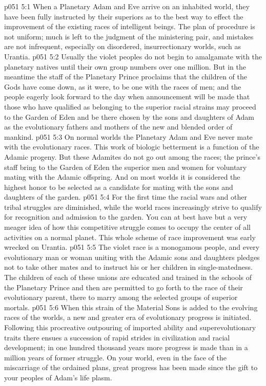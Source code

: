 \vs p051 5:1 When a Planetary Adam and Eve arrive on an inhabited world, they have been fully instructed by their superiors as to the best way to effect the improvement of the existing races of intelligent beings. The plan of procedure is not uniform; much is left to the judgment of the ministering pair, and mistakes are not infrequent, especially on disordered, insurrectionary worlds, such as Urantia.\plusone
\vs p051 5:2 Usually the violet peoples do not begin to amalgamate with the planetary natives until their own group numbers over one million. But in the meantime the staff of the Planetary Prince proclaims that the children of the Gods have come down, as it were, to be one with the races of men; and the people eagerly look forward to the day when announcement will be made that those who have qualified as belonging to the superior racial strains may proceed to the Garden of Eden and be there chosen by the sons and daughters of Adam as the evolutionary fathers and mothers of the new and blended order of mankind.
\vs p051 5:3 On normal worlds the Planetary Adam and Eve never mate with the evolutionary races. This work of biologic betterment is a function of the Adamic progeny. But these Adamites do not go out among the races; the prince’s staff bring to the Garden of Eden the superior men and women for voluntary mating with the Adamic offspring. And on most worlds it is considered the highest honor to be selected as a candidate for mating with the sons and daughters of the garden.
\vs p051 5:4 For the first time the racial wars and other tribal struggles are diminished, while the world races increasingly strive to qualify for recognition and admission to the garden. You can at best have but a very meager idea of how this competitive struggle comes to occupy the center of all activities on a normal planet. This whole scheme of race improvement was early wrecked on Urantia.
\pc \vs p051 5:5 The violet race is a monogamous people, and every evolutionary man or woman uniting with the Adamic sons and daughters pledges not to take other mates and to instruct his or her children in single\hyp{}matedness. The children of each of these unions are educated and trained in the schools of the Planetary Prince and then are permitted to go forth to the race of their evolutionary parent, there to marry among the selected groups of superior mortals.
\vs p051 5:6 When this strain of the Material Sons is added to the evolving races of the worlds, a new and greater era of evolutionary progress is initiated. Following this procreative outpouring of imported ability and superevolutionary traits there ensues a succession of rapid strides in civilization and racial development; in one hundred thousand years more progress is made than in a million years of former struggle. On your world, even in the face of the miscarriage of the ordained plans, great progress has been made since the gift to your peoples of Adam’s life plasm.
